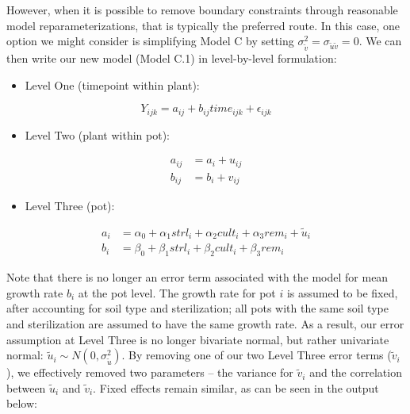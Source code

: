 \documentclass[
]{krantz}
\providecommand{\tightlist}{%
  \setlength{\itemsep}{0pt}\setlength{\parskip}{0pt}}
\begin{document}
However, when it is possible to remove boundary constraints through reasonable model reparameterizations, that is typically the preferred route. In this case, one option we might consider is simplifying Model C by setting \(\sigma_{\tilde{v}}^{2}=\sigma_{\tilde{u}\tilde{v}}=0\). We can then write our new model (Model C.1) in level-by-level formulation:

\begin{itemize}
\tightlist
\item
  Level One (timepoint within plant):
\end{itemize}

\begin{equation}
Y_{ijk} = a_{ij}+b_{ij}\textstyle{time}_{ijk}+\epsilon_{ijk}
\end{equation}

\begin{itemize}
\tightlist
\item
  Level Two (plant within pot):
\end{itemize}

\begin{align*}
a_{ij} & = a_{i}+u_{ij} \\
b_{ij} & = b_{i}+v_{ij}
\end{align*}

\begin{itemize}
\tightlist
\item
  Level Three (pot):
\end{itemize}

\begin{align*}
a_{i} & = \alpha_{0}+\alpha_{1}\textstyle{strl}_{i}+\alpha_{2}\textstyle{cult}_{i}+\alpha_{3}\textstyle{rem}_{i}+\tilde{u}_{i} \\
b_{i} & = \beta_{0}+\beta_{1}\textstyle{strl}_{i}+\beta_{2}\textstyle{cult}_{i}+\beta_{3}\textstyle{rem}_{i}
\end{align*}

Note that there is no longer an error term associated with the model for mean growth rate \(b_{i}\) at the pot level. The growth rate for pot \(i\) is assumed to be fixed, after accounting for soil type and sterilization; all pots with the same soil type and sterilization are assumed to have the same growth rate. As a result, our error assumption at Level Three is no longer bivariate normal, but rather univariate normal: \(\tilde{u}_{i}\sim N(0,\sigma_{\tilde{u}}^{2})\). By removing one of our two Level Three error terms (\(\tilde{v}_{i}\)), we effectively removed two parameters -- the variance for \(\tilde{v}_{i}\) and the correlation between \(\tilde{u}_{i}\) and \(\tilde{v}_{i}\). Fixed effects remain similar, as can be seen in the output below:
\end{document}

